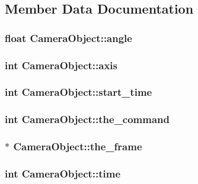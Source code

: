 \subsection{Member Data Documentation}
\hypertarget{struct_camera_object_ab02c981d766b44a1783be543b429daee}{
\subsubsection[{angle}]{\setlength{\rightskip}{0pt plus 5cm}float Camera\-Object\-::angle}}\label{struct_camera_object_ab02c981d766b44a1783be543b429daee}
\hypertarget{struct_camera_object_acf2d2c620f1dadd7d066b93fc801723c}{
\subsubsection[{axis}]{\setlength{\rightskip}{0pt plus 5cm}int Camera\-Object\-::axis}}\label{struct_camera_object_acf2d2c620f1dadd7d066b93fc801723c}
\hypertarget{struct_camera_object_ac670e7da3aa2804bc003a54d594d0c3d}{
\subsubsection[{start\-\_\-time}]{\setlength{\rightskip}{0pt plus 5cm}int Camera\-Object\-::start\-\_\-time}}\label{struct_camera_object_ac670e7da3aa2804bc003a54d594d0c3d}
\hypertarget{struct_camera_object_aa190f23fb76e74c150b4ab9d8634d859}{
\subsubsection[{the\-\_\-command}]{\setlength{\rightskip}{0pt plus 5cm}int Camera\-Object\-::the\-\_\-command}}\label{struct_camera_object_aa190f23fb76e74c150b4ab9d8634d859}
\hypertarget{struct_camera_object_a1228779759d82950e5d15b6be7a060ab}{
\subsubsection[{the\-\_\-frame}]{$\ast$ Camera\-Object\-::the\-\_\-frame}}\label{struct_camera_object_a1228779759d82950e5d15b6be7a060ab}
\hypertarget{struct_camera_object_a56cecd92bdd7c9187656bad549a0543b}{
\subsubsection[{time}]{\setlength{\rightskip}{0pt plus 5cm}int Camera\-Object\-::time}}\label{struct_camera_object_a56cecd92bdd7c9187656bad549a0543b}


